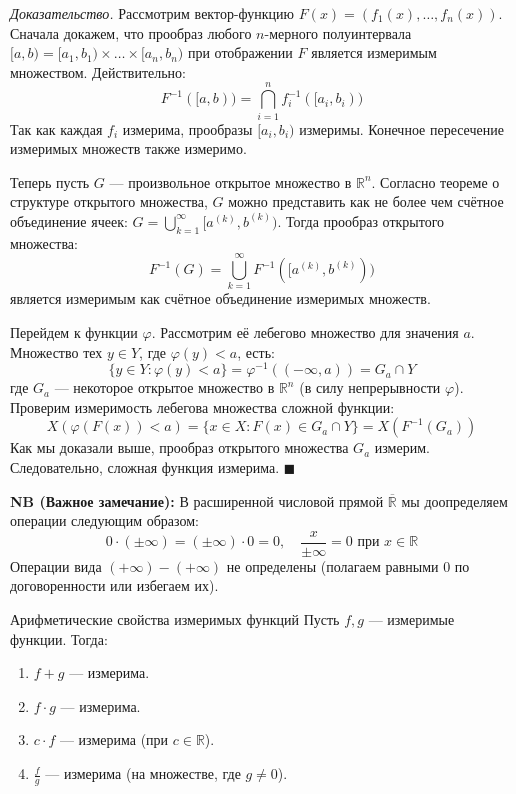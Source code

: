 \documentclass[12pt,a4paper]{article}
\newenvironment{Proof}[1][Доказательство]{\vspace{0.5em}\noindent\textit{#1.}\hspace{0.5em}\ignorespaces}{\hfill$\blacksquare$\vspace{1em}}
\begin{document}
\begin{Proof}
Рассмотрим вектор-функцию $F(x) = (f_1(x), \dots, f_n(x))$. 
Сначала докажем, что прообраз любого $n$-мерного полуинтервала $[a, b) = [a_1, b_1) \times \dots \times [a_n, b_n)$ при отображении $F$ является измеримым множеством. Действительно:
$$ F^{-1}([a, b)) = \bigcap\limits_{i=1}^n f_i^{-1}([a_i, b_i)) $$
Так как каждая $f_i$ измерима, прообразы $[a_i, b_i)$ измеримы. Конечное пересечение измеримых множеств также измеримо.

Теперь пусть $G$ — произвольное открытое множество в $\mathbb{R}^n$. Согласно теореме о структуре открытого множества, $G$ можно представить как не более чем счётное объединение ячеек: $G = \bigcup\limits_{k=1}^{\infty} [a^{(k)}, b^{(k)})$.
Тогда прообраз открытого множества:
$$ F^{-1}(G) = \bigcup\limits_{k=1}^{\infty} F^{-1}([a^{(k)}, b^{(k)})) $$
является измеримым как счётное объединение измеримых множеств.

Перейдем к функции $\varphi$. Рассмотрим её лебегово множество для значения $a$. Множество тех $y \in Y$, где $\varphi(y) < a$, есть:
$$ \{ y \in Y : \varphi(y) < a \} = \varphi^{-1}((-\infty, a)) = G_a \cap Y $$
где $G_a$ — некоторое открытое множество в $\mathbb{R}^n$ (в силу непрерывности $\varphi$).
Проверим измеримость лебегова множества сложной функции:
$$ X(\varphi(F(x)) < a) = \{ x \in X : F(x) \in G_a \cap Y \} = X(F^{-1}(G_a)) $$
Как мы доказали выше, прообраз открытого множества $G_a$ измерим. Следовательно, сложная функция измерима.
\end{Proof}

\noindent \textbf{NB (Важное замечание):} В расширенной числовой прямой $\overline{\mathbb{R}}$ мы доопределяем операции следующим образом:
$$ 0 \cdot (\pm \infty) = (\pm \infty) \cdot 0 = 0, \quad \frac{x}{\pm \infty} = 0 \text{ при } x \in \mathbb{R} $$
Операции вида $(+\infty) - (+ \infty)$ не определены (полагаем равными 0 по договоренности или избегаем их).

\begin{Theorem}{Арифметические свойства измеримых функций}{}
Пусть $f, g$ — измеримые функции. Тогда:
\begin{enumerate}
    \item $f + g$ — измерима.
    \item $f \cdot g$ — измерима.
    \item $c \cdot f$ — измерима (при $c \in \mathbb{R}$).
    \item $\frac{f}{g}$ — измерима (на множестве, где $g \neq 0$).
\end{enumerate}
\end{Theorem}
\end{document}
